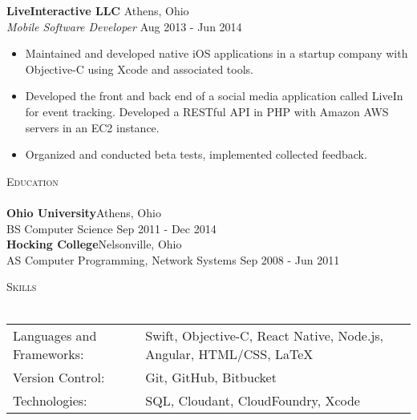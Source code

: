 \documentclass[a4paper]{article}
\newcommand{\lineunder} {
    \vspace*{-8pt} \\
    \hspace*{-18pt} \hrulefill \\
}
\newcommand{\header} [1] {
    {\hspace*{-18pt}\vspace*{6pt} \textsc{#1}}
    \vspace*{-6pt} \lineunder
}
\begin{document}
\vspace{1mm}
\textbf{LiveInteractive LLC} \hfill Athens, Ohio\\
\textit{Mobile Software Developer} \hfill Aug 2013 - Jun 2014\\
\vspace{-1mm}
\begin{itemize} \itemsep 1pt
	\item Maintained and developed native iOS applications in a startup company with Objective-C using Xcode and associated tools. 
	\item Developed the front and back end of a social media application called LiveIn for event tracking. Developed a RESTful API in PHP with Amazon AWS servers in an EC2 instance. 
	\item Organized and conducted beta tests, implemented collected feedback.
\end{itemize}


\header{Education}
\textbf{Ohio University}\hfill Athens, Ohio\\
BS Computer Science \hfill Sep 2011 - Dec 2014\\
\vspace{2mm}
\textbf{Hocking College}\hfill Nelsonville, Ohio\\
AS Computer Programming, Network Systems \hfill Sep 2008 - Jun 2011\\
\vspace{2mm}

\header{Skills}
\begin{tabular}{ l l }
	Languages and Frameworks: & Swift, Objective-C, React Native, Node.js, Angular, HTML/CSS, LaTeX\\
	Version Control:          & Git, GitHub, Bitbucket                                \\
	Technologies:             & SQL, Cloudant, CloudFoundry, Xcode                          \\
\end{tabular}
\end{document}
